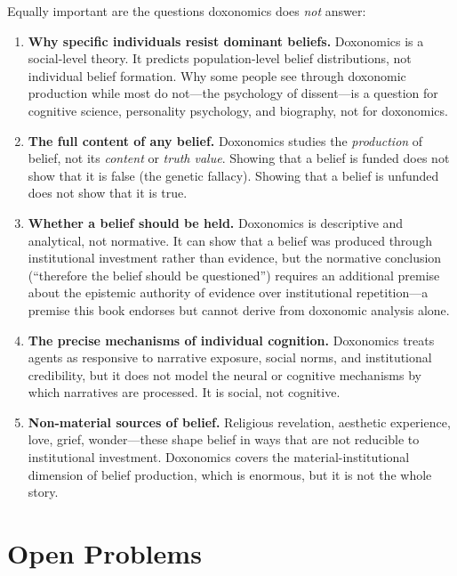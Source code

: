 Equally important are the questions doxonomics does \emph{not} answer:

\begin{enumerate}
  \item \textbf{Why specific individuals resist dominant beliefs.}
  Doxonomics is a social-level theory.
  It predicts population-level belief distributions, not individual belief formation.
  Why some people see through doxonomic production while most do not---the psychology of dissent---is a question for cognitive science, personality psychology, and biography, not for doxonomics.

  \item \textbf{The full content of any belief.}
  Doxonomics studies the \emph{production} of belief, not its \emph{content} or \emph{truth value}.
  Showing that a belief is funded does not show that it is false (the genetic fallacy).
  Showing that a belief is unfunded does not show that it is true.

  \item \textbf{Whether a belief should be held.}
  Doxonomics is descriptive and analytical, not normative.
  It can show that a belief was produced through institutional investment rather than evidence, but the normative conclusion (``therefore the belief should be questioned'') requires an additional premise about the epistemic authority of evidence over institutional repetition---a premise this book endorses but cannot derive from doxonomic analysis alone.

  \item \textbf{The precise mechanisms of individual cognition.}
  Doxonomics treats agents as responsive to narrative exposure, social norms, and institutional credibility, but it does not model the neural or cognitive mechanisms by which narratives are processed.
  It is social, not cognitive.

  \item \textbf{Non-material sources of belief.}
  Religious revelation, aesthetic experience, love, grief, wonder---these shape belief in ways that are not reducible to institutional investment.
  Doxonomics covers the material-institutional dimension of belief production, which is enormous, but it is not the whole story.
\end{enumerate}

\section{Open Problems}
\label{sec:ch35-open}


